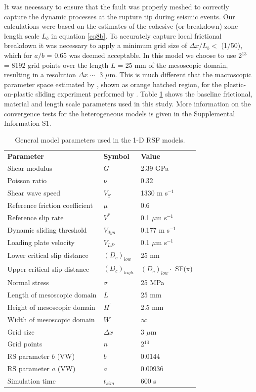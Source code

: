 \documentclass[preprint,1p, 10pt,authoryear]{elsarticle}
\begin{document}
It was necessary to ensure that the fault was properly meshed to correctly capture the dynamic processes at the rupture tip during seismic events. Our calculations were based on the estimates of the cohesive (or breakdown) zone length scale $L_{b}$ in equation \eqref{eq8b}. To accurately capture local frictional breakdown it was necessary to apply a minimum grid size of $\Delta x/L_{b} <$ (1/50), which for $a/b$ = 0.65 was deemed acceptable.  In this model we choose to use 2$^{13}$ = 8192 grid points over the length $L$ = 25 mm of the mesoscopic domain, resulting in a resolution $\Delta x \sim$  3 $\mu$m. This is much different that the macroscopic parameter space estimated by \citet{Kaneko2016}, shown as orange hatched region, for the plastic-on-plastic sliding experiment performed by \citet{Latour2013}. Table \ref{table1} shows the baseline frictional, material and length scale parameters used in this study. More information on the convergence tests for the heterogeneous models is given in the Supplemental Information S1.

\begin{table}[ht]
	\centering
	\caption{General model parameters used in the 1-D RSF models.}
	\begin{tabular}{ m{5cm} m{2cm} m{4cm}} 
		\hline  
		\bf{Parameter} 			& \bf{Symbol} 		& \bf{Value}	\\
		Shear modulus  			& $G$  		 	& 2.39 GPa		\\
		Poisson ratio  			& $\nu$  	 	& 0.32 		\\
		Shear wave speed		& $V_{S}$      		& 1330 m s$^{-1}$	\\
		Reference friction coefficient	& $\mu$	        & 0.6	\\
		Reference slip rate  		& $V^{*}$     		&  0.1 $\mu$m s$^{-1}$\\
		Dynamic sliding threshold   	& $V_{dyn}$  		& 0.177 m s$^{-1}$ \\
		Loading plate velocity  	& $V_{LP}$     		&  0.1 $\mu$m s$^{-1}$\\
		Lower critical slip distance 	& $\left(D_{c}\right)_{low}$    &  25 nm\\
        Upper critical slip distance 	& $\left(D_{c}\right)_{high}$    &  $\left(D_{c}\right)_{low} \cdot$ SF(x)\\
		Normal stress 			& $\sigma$  		&  25 MPa \\
		Length of mesoscopic domain 	&   $L$  		& 25 mm\\
		Height of mesoscopic domain 	&   $H^{'}$  		& 2.5 mm\\
		Width of mesoscopic domain 	&   $W$   		& $\infty$\\
		Grid size 			& $\Delta x$ 		& 3 $\mu$m \\
		Grid points 			& $n$ 			& 2$^{13}$ \\
		RS parameter $b$ (VW)  		& $b$ 			& 0.0144  \\
		RS parameter $a$ (VW)  		& $a$ 			& 0.00936  \\
	    Simulation time 			& $t_{sim}$ 		& 600 s  \\
		\hline  	
	\end{tabular}
	\label{table1}
\end{table}
\end{document}
